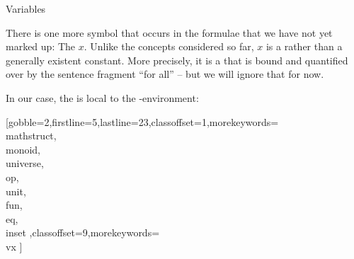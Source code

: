 \documentclass[lang={en,de}]{stex}
\begin{document}
  \begin{sfragment}{Variables}


    There is one more symbol that occurs in the formulae that we have not
    yet marked up: The $x$. Unlike the concepts considered
    so far, $x$ is a \emph{} rather than a
    generally existent constant. More precisely, it is
    a  that is bound and quantified over
    by the sentence fragment ``for all'' -- but we will ignore that for
    now.


    In our case, the  is local to the 
    -environment:

    [gobble=2,firstline=5,lastline=23,classoffset=1,morekeywords={
    \\mathstruct,\\monoid,\\universe,\\op,\\unit,\\fun,\\eq,\\inset
    },classoffset=9,morekeywords={
      \\vx
    }]
  
  \end{sfragment}
\end{document}
